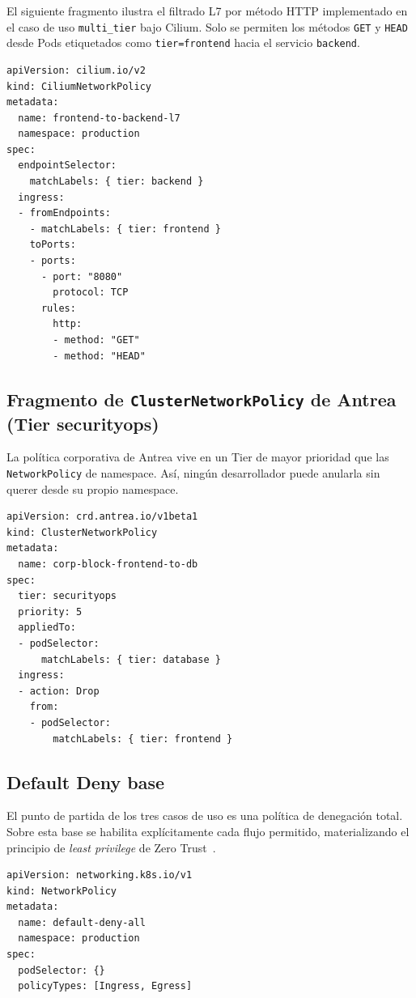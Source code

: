 El siguiente fragmento ilustra el filtrado L7 por método HTTP implementado en el caso de uso \texttt{multi\_tier} bajo Cilium. Solo se permiten los métodos \texttt{GET} y \texttt{HEAD} desde Pods etiquetados como \texttt{tier=frontend} hacia el servicio \texttt{backend}.

\begin{lstlisting}
apiVersion: cilium.io/v2
kind: CiliumNetworkPolicy
metadata:
  name: frontend-to-backend-l7
  namespace: production
spec:
  endpointSelector:
    matchLabels: { tier: backend }
  ingress:
  - fromEndpoints:
    - matchLabels: { tier: frontend }
    toPorts:
    - ports:
      - port: "8080"
        protocol: TCP
      rules:
        http:
        - method: "GET"
        - method: "HEAD"
\end{lstlisting}

\subsection{Fragmento de \texttt{ClusterNetworkPolicy} de Antrea (Tier securityops)} \label{subsec:apb2_yaml_antrea}

La política corporativa de Antrea vive en un Tier de mayor prioridad que las \texttt{NetworkPolicy} de namespace. Así, ningún desarrollador puede anularla sin querer desde su propio namespace.

\begin{lstlisting}
apiVersion: crd.antrea.io/v1beta1
kind: ClusterNetworkPolicy
metadata:
  name: corp-block-frontend-to-db
spec:
  tier: securityops
  priority: 5
  appliedTo:
  - podSelector:
      matchLabels: { tier: database }
  ingress:
  - action: Drop
    from:
    - podSelector:
        matchLabels: { tier: frontend }
\end{lstlisting}

\subsection{Default Deny base} \label{subsec:apb2_yaml_deny}

El punto de partida de los tres casos de uso es una política de denegación total. Sobre esta base se habilita explícitamente cada flujo permitido, materializando el principio de \emph{least privilege} de Zero Trust~\cite{ref24,ref25}.

\begin{lstlisting}
apiVersion: networking.k8s.io/v1
kind: NetworkPolicy
metadata:
  name: default-deny-all
  namespace: production
spec:
  podSelector: {}
  policyTypes: [Ingress, Egress]
\end{lstlisting}

